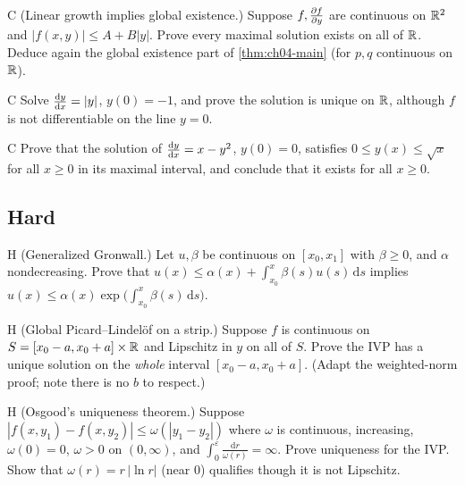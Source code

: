 \begin{problem}{C}\label{prob:ch08-c6}
(Linear growth implies global existence.) Suppose $f,\frac{\partial f}{\partial y}$ are continuous
on $\mathbb{R}^2$ and $|f(x,y)|\le A + B|y|$. Prove every maximal solution exists on
all of $\mathbb{R}$. Deduce again the global existence part of \cref{thm:ch04-main}
(for $p,q$ continuous on $\mathbb{R}$).
\end{problem}

\begin{problem}{C}\label{prob:ch08-c7}
Solve $\frac{\mathrm{d}y}{\mathrm{d}x} = |y|$, $y(0) = -1$, and prove the solution is unique on $\mathbb{R}$,
although $f$ is not differentiable on the line $y = 0$.
\end{problem}

\begin{problem}{C}\label{prob:ch08-c8}
Prove that the solution of $\frac{\mathrm{d}y}{\mathrm{d}x} = x - y^2$, $y(0) = 0$, satisfies
$0\le y(x)\le\sqrt x$ for all $x\ge0$ in its maximal interval, and conclude
that it exists for all $x\ge0$.
\end{problem}

\subsection*{Hard}

\begin{problem}{H}\label{prob:ch08-h1}
(Generalized Gronwall.) Let $u,\beta$ be continuous on $[x_0,x_1]$ with
$\beta\ge0$, and $\alpha$ nondecreasing. Prove that
$u(x)\le\alpha(x) + \int_{x_0}^x\beta(s)u(s)\,\mathrm{d}s$ implies
$u(x)\le\alpha(x)\exp\bigl(\int_{x_0}^x\beta(s)\,\mathrm{d}s\bigr)$.
\end{problem}

\begin{problem}{H}\label{prob:ch08-h2}
(Global Picard--Lindel\"of on a strip.) Suppose $f$ is continuous on
$S = [x_0 - a, x_0 + a]\times\mathbb{R}$ and Lipschitz in $y$ on all of $S$. Prove the
IVP has a unique solution on the \emph{whole} interval $[x_0 - a, x_0 + a]$.
(Adapt the weighted-norm proof; note there is no $b$ to respect.)
\end{problem}

\begin{problem}{H}\label{prob:ch08-h3}
(Osgood's uniqueness theorem.) Suppose
$|f(x,y_1) - f(x,y_2)|\le\omega(|y_1 - y_2|)$ where $\omega$ is continuous,
increasing, $\omega(0) = 0$, $\omega>0$ on $(0,\infty)$, and
$\int_0^\varepsilon\frac{\mathrm{d}r}{\omega(r)} = \infty$. Prove uniqueness for the
IVP. Show that $\omega(r) = r\,|\ln r|$ (near $0$) qualifies though it is not
Lipschitz.
\end{problem}

